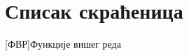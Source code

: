 \documentclass[12pt, a4paper]{article}
\theoremstyle{definition}
\begin{document}
\endgroup

\newpage

\section*{Списак скраћеница}
\begin{acronym}
[ФВР]{Функције вишег реда}
\end{acronym}

\listoftables

\newpage

\listoffigures
\end{document}
